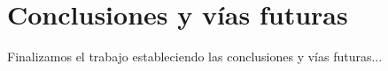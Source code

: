 
\chapter{Conclusiones y vías futuras}

Finalizamos el trabajo estableciendo las conclusiones y vías futuras...